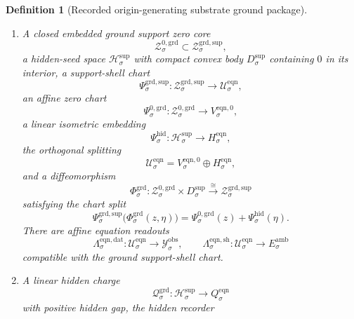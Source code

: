 \documentclass[11pt]{article}
\newcommand{\DataSpace}[1]{\mathcal Y_{#1}^{\mathrm{obs}}}
\newcommand{\AmbientTarget}[1]{E_{#1}^{\mathrm{amb}}}
\newcommand{\GroundShellSet}[1]{\mathcal Z_{#1}^{\mathrm{grd}}}
\newcommand{\GroundChart}[1]{\Xi_{#1}^{\mathrm{grd}}}
\newcommand{\GroundSupport}[1]{\Theta_{#1}^{\mathrm{grd,sup}}}
\newcommand{\GroundSupportShell}[1]{\mathcal Z_{#1}^{\mathrm{grd,sup}}}
\newcommand{\GroundZeroCore}[1]{\mathcal Z_{#1}^{0,\mathrm{grd}}}
\newcommand{\GroundEqChart}[1]{\Psi_{#1}^{\mathrm{grd,sup}}}
\newcommand{\GroundZeroChart}[1]{\Psi_{#1}^{0,\mathrm{grd}}}
\newcommand{\GroundSplit}[1]{\Phi_{#1}^{\mathrm{grd}}}
\newcommand{\GroundCharge}[1]{\mathcal Q_{#1}^{\mathrm{grd}}}
\newcommand{\ResSpace}[1]{\mathcal U_{#1}^{\mathrm{sup,res}}}
\newcommand{\ResBody}[1]{\mathcal B_{#1}^{\mathrm{sup,res}}}
\newcommand{\ResTarget}[1]{S_{#1}^{\mathrm{sup,res}}}
\newcommand{\ResSection}[1]{\Theta_{#1}^{\mathrm{sup,res}}}
\newcommand{\ResData}[1]{\Lambda_{#1}^{\mathrm{sup,dat}}}
\newcommand{\ResShellMap}[1]{\Lambda_{#1}^{\mathrm{sup,sh}}}
\newcommand{\ResShellSet}[1]{\mathcal Z_{#1}^{\mathrm{sup,res}}}
\newcommand{\SeedHidden}[1]{\mathcal H_{#1}^{\mathrm{sup}}}
\newcommand{\SeedHiddenBody}[1]{D_{#1}^{\mathrm{sup}}}
\newcommand{\HiddenChart}[1]{\Psi_{#1}^{\mathrm{hid}}}
\newcommand{\EqnSpace}[1]{\mathcal U_{#1}^{\mathrm{eqn}}}
\newcommand{\EqnTarget}[1]{Q_{#1}^{\mathrm{eqn}}}
\newcommand{\EqnData}[1]{\Lambda_{#1}^{\mathrm{eqn,dat}}}
\newcommand{\EqnShell}[1]{\Lambda_{#1}^{\mathrm{eqn,sh}}}
\newcommand{\EqnHidden}[1]{H_{#1}^{\mathrm{eqn}}}
\newcommand{\EqnZero}[1]{V_{#1}^{\mathrm{eqn},0}}
\newtheorem{definition}{Definition}
\begin{document}
\begin{definition}[Recorded origin-generating substrate ground package]
\begin{enumerate}
\[    \]
    whose image
    \[
    \ResBody{\sigma}
    \equiv
    \GroundChart{\sigma}\bigl(\GroundShellSet{\sigma}\bigr)
    \]
    is compact convex with nonempty interior, affine readouts
    \[
    \ResData{\sigma}:\ResSpace{\sigma}\to\DataSpace{\sigma},
    \qquad
    \ResShellMap{\sigma}:\ResSpace{\sigma}\to\AmbientTarget{\sigma},
    \]
    a smooth support section
    \[
    \ResSection{\sigma}:\ResSpace{\sigma}\to\ResTarget{\sigma},
    \]
    a shell-internal support recorder
    \[
    \GroundSupport{\sigma}:\GroundShellSet{\sigma}\to\ResTarget{\sigma},
    \]
    and the exact ground support shell
    \[
    \GroundSupportShell{\sigma}
    \equiv
    \bigl(\GroundSupport{\sigma}\bigr)^{-1}(0)\cap\GroundShellSet{\sigma}.
    \]
    The support section satisfies
    \[
    \ResShellSet{\sigma}
    \equiv
    \bigl(\ResSection{\sigma}\bigr)^{-1}(0)\cap\ResBody{\sigma}
    =
    \GroundChart{\sigma}\bigl(\GroundSupportShell{\sigma}\bigr),
    \]
    together with the normal estimate already recorded on the active line.
    \item A closed embedded ground support zero core
    \[
    \GroundZeroCore{\sigma}\subset\GroundSupportShell{\sigma},
    \]
    a hidden-seed space \(\SeedHidden{\sigma}\) with compact convex body \(\SeedHiddenBody{\sigma}\) containing \(0\) in its interior, a support-shell chart
    \[
    \GroundEqChart{\sigma}:\GroundSupportShell{\sigma}\to\EqnSpace{\sigma},
    \]
    an affine zero chart
    \[
    \GroundZeroChart{\sigma}:\GroundZeroCore{\sigma}\to\EqnZero{\sigma},
    \]
    a linear isometric embedding
    \[
    \HiddenChart{\sigma}:\SeedHidden{\sigma}\to\EqnHidden{\sigma},
    \]
    the orthogonal splitting
    \[
    \EqnSpace{\sigma}
    =
    \EqnZero{\sigma}\oplus\EqnHidden{\sigma},
    \]
    and a diffeomorphism
    \[
    \GroundSplit{\sigma}:
    \GroundZeroCore{\sigma}\times\SeedHiddenBody{\sigma}
    \xrightarrow{\cong}
    \GroundSupportShell{\sigma}
    \]
    satisfying the chart split
    \[
    \GroundEqChart{\sigma}\bigl(\GroundSplit{\sigma}(z,\eta)\bigr)
    =
    \GroundZeroChart{\sigma}(z)+\HiddenChart{\sigma}(\eta).
    \]
    There are affine equation readouts
    \[
    \EqnData{\sigma}:\EqnSpace{\sigma}\to\DataSpace{\sigma},
    \qquad
    \EqnShell{\sigma}:\EqnSpace{\sigma}\to\AmbientTarget{\sigma}
    \]
    compatible with the ground support-shell chart.
    \item A linear hidden charge
    \[
    \GroundCharge{\sigma}:\SeedHidden{\sigma}\to\EqnTarget{\sigma}
    \]
    with positive hidden gap, the hidden recorder

\end{enumerate}
\end{definition}
\end{document}
